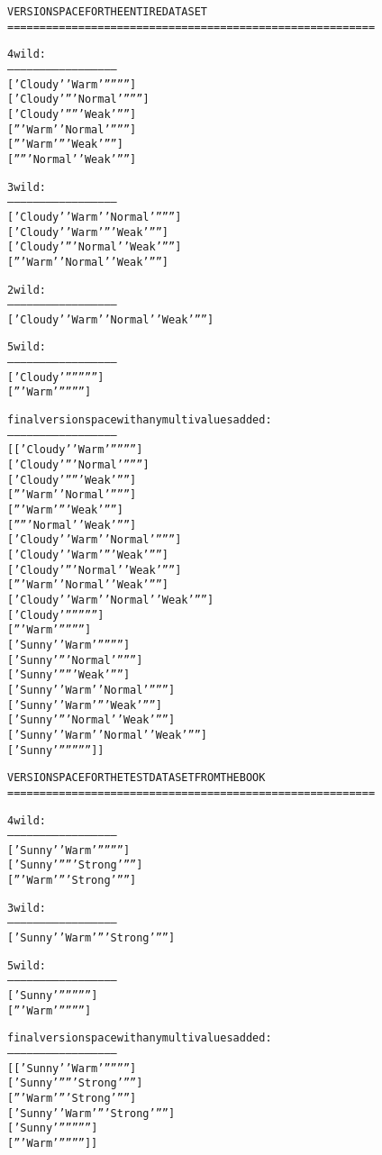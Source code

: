 \begin{multicols}{2}
\begin{shaded}
\scriptsize
\begin{alltt}
VERSION SPACE FOR THE ENTIRE DATASET
=========================================================

 4 wild :
--------------------------------------------------
['Cloudy' 'Warm' '' '' '' '']
['Cloudy' '' 'Normal' '' '' '']
['Cloudy' '' '' 'Weak' '' '']
['' 'Warm' 'Normal' '' '' '']
['' 'Warm' '' 'Weak' '' '']
['' '' 'Normal' 'Weak' '' '']

 3 wild :
--------------------------------------------------
['Cloudy' 'Warm' 'Normal' '' '' '']
['Cloudy' 'Warm' '' 'Weak' '' '']
['Cloudy' '' 'Normal' 'Weak' '' '']
['' 'Warm' 'Normal' 'Weak' '' '']

 2 wild :
--------------------------------------------------
['Cloudy' 'Warm' 'Normal' 'Weak' '' '']

 5 wild :
--------------------------------------------------
['Cloudy' '' '' '' '' '']
['' 'Warm' '' '' '' '']


 final version space with any multivalues added :
--------------------------------------------------
[['Cloudy' 'Warm' '' '' '' '']
 ['Cloudy' '' 'Normal' '' '' '']
 ['Cloudy' '' '' 'Weak' '' '']
 ['' 'Warm' 'Normal' '' '' '']
 ['' 'Warm' '' 'Weak' '' '']
 ['' '' 'Normal' 'Weak' '' '']
 ['Cloudy' 'Warm' 'Normal' '' '' '']
 ['Cloudy' 'Warm' '' 'Weak' '' '']
 ['Cloudy' '' 'Normal' 'Weak' '' '']
 ['' 'Warm' 'Normal' 'Weak' '' '']
 ['Cloudy' 'Warm' 'Normal' 'Weak' '' '']
 ['Cloudy' '' '' '' '' '']
 ['' 'Warm' '' '' '' '']
 ['Sunny' 'Warm' '' '' '' '']
 ['Sunny' '' 'Normal' '' '' '']
 ['Sunny' '' '' 'Weak' '' '']
 ['Sunny' 'Warm' 'Normal' '' '' '']
 ['Sunny' 'Warm' '' 'Weak' '' '']
 ['Sunny' '' 'Normal' 'Weak' '' '']
 ['Sunny' 'Warm' 'Normal' 'Weak' '' '']
 ['Sunny' '' '' '' '' '']]
\end{alltt}
\small
\end{shaded}

\begin{shaded}
\scriptsize
\begin{alltt}
VERSION SPACE FOR THE TEST DATASET FROM THE BOOK
=========================================================

 4 wild :
--------------------------------------------------
['Sunny' 'Warm' '' '' '' '']
['Sunny' '' '' 'Strong' '' '']
['' 'Warm' '' 'Strong' '' '']

 3 wild :
--------------------------------------------------
['Sunny' 'Warm' '' 'Strong' '' '']

 5 wild :
--------------------------------------------------
['Sunny' '' '' '' '' '']
['' 'Warm' '' '' '' '']


 final version space with any multivalues added :
--------------------------------------------------
[['Sunny' 'Warm' '' '' '' '']
 ['Sunny' '' '' 'Strong' '' '']
 ['' 'Warm' '' 'Strong' '' '']
 ['Sunny' 'Warm' '' 'Strong' '' '']
 ['Sunny' '' '' '' '' '']
 ['' 'Warm' '' '' '' '']]
\end{alltt}
\small
\end{shaded}
\end{multicols}

\newpage









